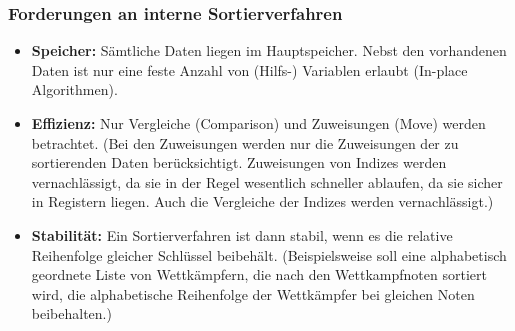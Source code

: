 \subsubsection{Forderungen an interne Sortierverfahren}
\begin{itemize}
    \item \textbf{Speicher:} Sämtliche Daten liegen im Hauptspeicher. Nebst den vorhandenen Daten ist nur eine feste Anzahl von (Hilfs-) Variablen erlaubt (In-place Algorithmen). 
    \item \textbf{Effizienz:} Nur Vergleiche (Comparison) und Zuweisungen (Move) werden betrachtet.
    (Bei den Zuweisungen werden nur die Zuweisungen der zu sortierenden Daten berücksichtigt. Zuweisungen von Indizes werden vernachlässigt, da sie in der Regel wesentlich schneller ablaufen, da sie sicher in Registern liegen. Auch die Vergleiche der Indizes werden vernachlässigt.)
    \item \textbf{Stabilität:} Ein Sortierverfahren ist dann stabil, wenn es die relative Reihenfolge gleicher Schlüssel beibehält. (Beispielsweise soll eine alphabetisch geordnete Liste von Wettkämpfern, die nach den Wettkampfnoten sortiert wird, die alphabetische Reihenfolge der Wettkämpfer bei gleichen Noten beibehalten.)
\end{itemize}

